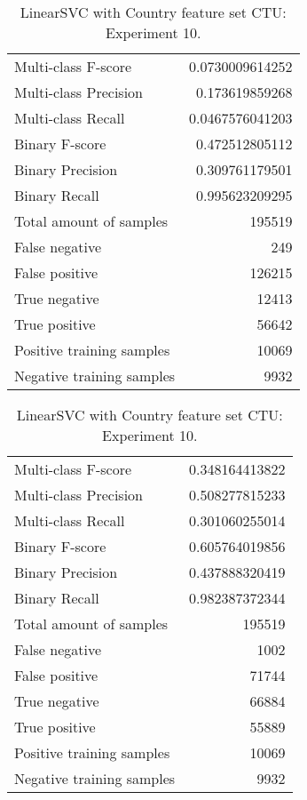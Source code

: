 \begin{table}[H]
\begin{minipage}{0.5\textwidth}
\caption{LinearSVC with Country feature set CTU: Experiment 9.}
\centering
\begin{tabular}{l r}
\toprule
Multi-class F-score & 0.0730009614252 \\
Multi-class Precision & 0.173619859268 \\
Multi-class Recall & 0.0467576041203 \\
\midrule
Binary F-score & 0.472512805112 \\
Binary Precision & 0.309761179501 \\
Binary Recall & 0.995623209295 \\
\midrule
Total amount of samples & 195519 \\
False negative & 249 \\
False positive & 126215 \\
True negative & 12413 \\
True positive & 56642 \\
\midrule
Positive training samples & 10069 \\
Negative training samples & 9932 \\
\bottomrule
\end{tabular}
\end{minipage}
\hfillx
\begin{minipage}{0.5\textwidth}
\caption{LinearSVC with Country feature set CTU: Experiment 10.}
\centering
\begin{tabular}{l r}
\toprule
Multi-class F-score & 0.348164413822 \\
Multi-class Precision & 0.508277815233 \\
Multi-class Recall & 0.301060255014 \\
\midrule
Binary F-score & 0.605764019856 \\
Binary Precision & 0.437888320419 \\
Binary Recall & 0.982387372344 \\
\midrule
Total amount of samples & 195519 \\
False negative & 1002 \\
False positive & 71744 \\
True negative & 66884 \\
True positive & 55889 \\
\midrule
Positive training samples & 10069 \\
Negative training samples & 9932 \\
\bottomrule
\end{tabular}
\end{minipage}
\end{table}
